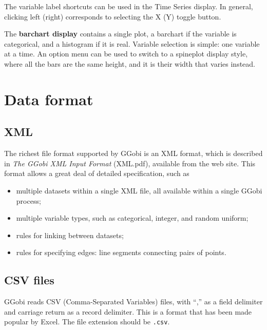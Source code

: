 \documentclass[11pt]{article}
\def\Widget#1{\textbf{#1}}
\begin{document}
The variable label shortcuts can be used in the Time Series display.
In general, clicking left (right) corresponds to selecting the X
(Y) toggle button.


The \Widget{barchart display} contains a single plot, a barchart if the
variable is categorical, and a histogram if it is real.   Variable
selection is simple: one variable at a time.  An option menu can be used
to switch to a spineplot display style, where all the bars are the same
height, and it is their width that varies instead.


\section{Data format}
\label{slbl:DataFormat}

\subsection {XML}
\label{slbl:XML}

The richest file format supported by GGobi is an XML format, which is
described in {\em The GGobi XML Input Format} (XML.pdf), available
from the web site.  This format allows a great deal of detailed
specification, such as

\begin{itemize}
\item multiple datasets within a single XML file, all available within
      a single GGobi process;
\item multiple variable types, such as categorical, integer, and 
      random uniform;
\item rules for linking between datasets;
\item rules for specifying edges: line segments connecting pairs of points.
\end{itemize}

\subsection {CSV files}
\label{slbl:excel}

GGobi reads CSV (Comma-Separated Variables) files, with ``,'' as a
field delimiter and carriage return as a record delimiter.  This is a
format that has been made popular by Excel.  The file extension should
be {\tt .csv}.
\end{document}
